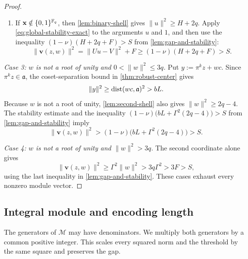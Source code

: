 \begin{proof}
\begin{enumerate}[label=(\alph*)]
\item If $\mathbf x\notin\{0,1\}^{\mathbb F_q}$, then \cref{lem:binary-shell} gives
$\|u\|^2\ge H+2q$.  Apply
\cref{eq:global-stability-exact} to the arguments $u$ and $1$, and then use
the inequality $(1-\nu)(H+2q+F)>S$ from
\cref{lem:gap-and-stability}:
\[
 \|\mathbf v(z,w)\|^2
 =\|Uu-V\|^2+F
 \ge(1-\nu)(H+2q+F)>S.
\]
\end{enumerate}

\smallskip
\noindent\emph{Case 3: $w$ is not a root of unity and
$0<\|w\|^2\le3q$.}
Put $y:=\pi^kz+wc$.  Since $\pi^kz\in\mathfrak a$, the
coset-separation bound in \cref{thm:robust-center} gives
\[
 \|y\|^2\ge\operatorname{dist}(wc,\mathfrak a)^2>bL.
\]
Because $w$ is not a root of unity, \cref{lem:second-shell} also gives
$\|w\|^2\ge2q-4$.  The stability estimate and
the inequality
$(1-\nu)\bigl(bL+\Gamma^2(2q-4)\bigr)>S$ from
\cref{lem:gap-and-stability} imply
\[
 \|\mathbf v(z,w)\|^2
 >(1-\nu)\bigl(bL+\Gamma^2(2q-4)\bigr)>S.
\]

\smallskip
\noindent\emph{Case 4: $w$ is not a root of unity and
$\|w\|^2>3q$.}
The second coordinate alone gives
\[
 \|\mathbf v(z,w)\|^2
 \ge\Gamma^2\|w\|^2
 >3q\Gamma^2>3F>S,
\]
using the last inequality in \cref{lem:gap-and-stability}.  These cases exhaust every nonzero module
vector.
\end{proof}

\subsection{Integral module and encoding length}
\label{subsec:denominator-clearing}

The generators of $\mathcal M$ may have denominators.  We multiply
both generators by a common positive integer.  This scales every squared norm
and the threshold by the same square and preserves the gap.
